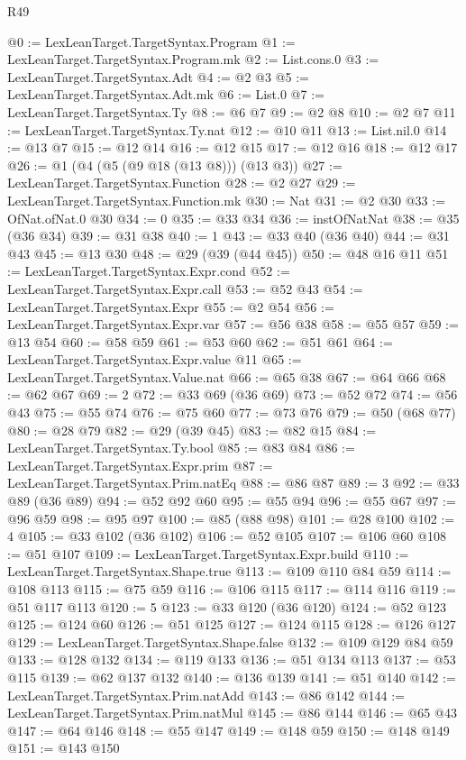 \begin{lexlean}{R49}
\begin{coremodule}
@0 := LexLeanTarget.TargetSyntax.Program
@1 := LexLeanTarget.TargetSyntax.Program.mk
@2 := List.cons.{0}
@3 := LexLeanTarget.TargetSyntax.Adt
@4 := @2 @3
@5 := LexLeanTarget.TargetSyntax.Adt.mk
@6 := List.{0}
@7 := LexLeanTarget.TargetSyntax.Ty
@8 := @6 @7
@9 := @2 @8
@10 := @2 @7
@11 := LexLeanTarget.TargetSyntax.Ty.nat
@12 := @10 @11
@13 := List.nil.{0}
@14 := @13 @7
@15 := @12 @14
@16 := @12 @15
@17 := @12 @16
@18 := @12 @17
@26 := @1 (@4 (@5 (@9 @18 (@13 @8))) (@13 @3))
@27 := LexLeanTarget.TargetSyntax.Function
@28 := @2 @27
@29 := LexLeanTarget.TargetSyntax.Function.mk
@30 := Nat
@31 := @2 @30
@33 := OfNat.ofNat.{0} @30
@34 := 0
@35 := @33 @34
@36 := instOfNatNat
@38 := @35 (@36 @34)
@39 := @31 @38
@40 := 1
@43 := @33 @40 (@36 @40)
@44 := @31 @43
@45 := @13 @30
@48 := @29 (@39 (@44 @45))
@50 := @48 @16 @11
@51 := LexLeanTarget.TargetSyntax.Expr.cond
@52 := LexLeanTarget.TargetSyntax.Expr.call
@53 := @52 @43
@54 := LexLeanTarget.TargetSyntax.Expr
@55 := @2 @54
@56 := LexLeanTarget.TargetSyntax.Expr.var
@57 := @56 @38
@58 := @55 @57
@59 := @13 @54
@60 := @58 @59
@61 := @53 @60
@62 := @51 @61
@64 := LexLeanTarget.TargetSyntax.Expr.value @11
@65 := LexLeanTarget.TargetSyntax.Value.nat
@66 := @65 @38
@67 := @64 @66
@68 := @62 @67
@69 := 2
@72 := @33 @69 (@36 @69)
@73 := @52 @72
@74 := @56 @43
@75 := @55 @74
@76 := @75 @60
@77 := @73 @76
@79 := @50 (@68 @77)
@80 := @28 @79
@82 := @29 (@39 @45)
@83 := @82 @15
@84 := LexLeanTarget.TargetSyntax.Ty.bool
@85 := @83 @84
@86 := LexLeanTarget.TargetSyntax.Expr.prim
@87 := LexLeanTarget.TargetSyntax.Prim.natEq
@88 := @86 @87
@89 := 3
@92 := @33 @89 (@36 @89)
@94 := @52 @92 @60
@95 := @55 @94
@96 := @55 @67
@97 := @96 @59
@98 := @95 @97
@100 := @85 (@88 @98)
@101 := @28 @100
@102 := 4
@105 := @33 @102 (@36 @102)
@106 := @52 @105
@107 := @106 @60
@108 := @51 @107
@109 := LexLeanTarget.TargetSyntax.Expr.build
@110 := LexLeanTarget.TargetSyntax.Shape.true
@113 := @109 @110 @84 @59
@114 := @108 @113
@115 := @75 @59
@116 := @106 @115
@117 := @114 @116
@119 := @51 @117 @113
@120 := 5
@123 := @33 @120 (@36 @120)
@124 := @52 @123
@125 := @124 @60
@126 := @51 @125
@127 := @124 @115
@128 := @126 @127
@129 := LexLeanTarget.TargetSyntax.Shape.false
@132 := @109 @129 @84 @59
@133 := @128 @132
@134 := @119 @133
@136 := @51 @134 @113
@137 := @53 @115
@139 := @62 @137 @132
@140 := @136 @139
@141 := @51 @140
@142 := LexLeanTarget.TargetSyntax.Prim.natAdd
@143 := @86 @142
@144 := LexLeanTarget.TargetSyntax.Prim.natMul
@145 := @86 @144
@146 := @65 @43
@147 := @64 @146
@148 := @55 @147
@149 := @148 @59
@150 := @148 @149
@151 := @143 @150

\end{coremodule}
\end{lexlean}
